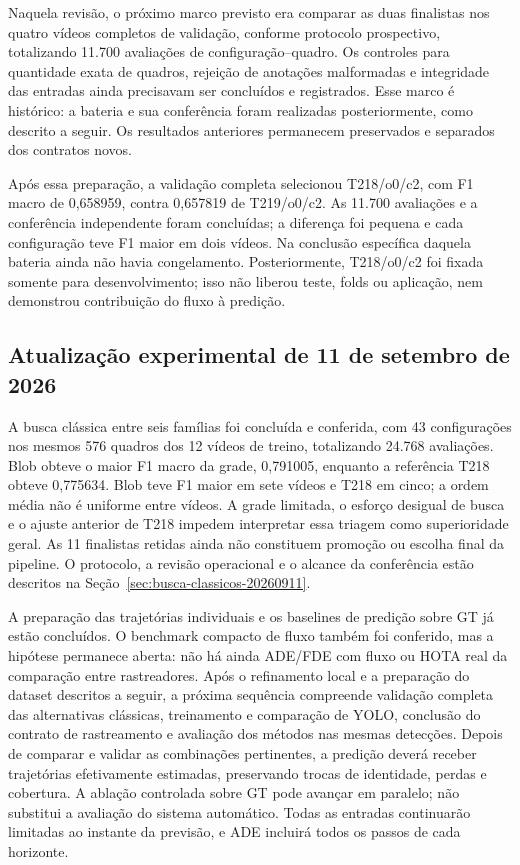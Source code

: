 Naquela revisão, o próximo marco previsto era comparar as duas finalistas nos quatro vídeos completos de validação, conforme protocolo prospectivo, totalizando 11.700 avaliações de configuração--quadro. Os controles para quantidade exata de quadros, rejeição de anotações malformadas e integridade das entradas ainda precisavam ser concluídos e registrados. Esse marco é histórico: a bateria e sua conferência foram realizadas posteriormente, como descrito a seguir. Os resultados anteriores permanecem preservados e separados dos contratos novos.

Após essa preparação, a validação completa selecionou T218/o0/c2, com F1 macro de 0,658959, contra 0,657819 de T219/o0/c2. As 11.700 avaliações e a conferência independente foram concluídas; a diferença foi pequena e cada configuração teve F1 maior em dois vídeos. Na conclusão específica daquela bateria ainda não havia congelamento. Posteriormente, T218/o0/c2 foi fixada somente para desenvolvimento; isso não liberou teste, folds ou aplicação, nem demonstrou contribuição do fluxo à predição.

\subsection{Atualização experimental de 11 de setembro de 2026}

A busca clássica entre seis famílias foi concluída e conferida, com 43 configurações nos mesmos 576 quadros dos 12 vídeos de treino, totalizando 24.768 avaliações. Blob obteve o maior F1 macro da grade, 0,791005, enquanto a referência T218 obteve 0,775634. Blob teve F1 maior em sete vídeos e T218 em cinco; a ordem média não é uniforme entre vídeos. A grade limitada, o esforço desigual de busca e o ajuste anterior de T218 impedem interpretar essa triagem como superioridade geral. As 11 finalistas retidas ainda não constituem promoção ou escolha final da pipeline. O protocolo, a revisão operacional e o alcance da conferência estão descritos na Seção~\ref{sec:busca-classicos-20260911}.

A preparação das trajetórias individuais e os baselines de predição sobre GT já estão concluídos. O benchmark compacto de fluxo também foi conferido, mas a hipótese permanece aberta: não há ainda ADE/FDE com fluxo ou HOTA real da comparação entre rastreadores. Após o refinamento local e a preparação do dataset descritos a seguir, a próxima sequência compreende validação completa das alternativas clássicas, treinamento e comparação de YOLO, conclusão do contrato de rastreamento e avaliação dos métodos nas mesmas detecções. Depois de comparar e validar as combinações pertinentes, a predição deverá receber trajetórias efetivamente estimadas, preservando trocas de identidade, perdas e cobertura. A ablação controlada sobre GT pode avançar em paralelo; não substitui a avaliação do sistema automático. Todas as entradas continuarão limitadas ao instante da previsão, e ADE incluirá todos os passos de cada horizonte.

